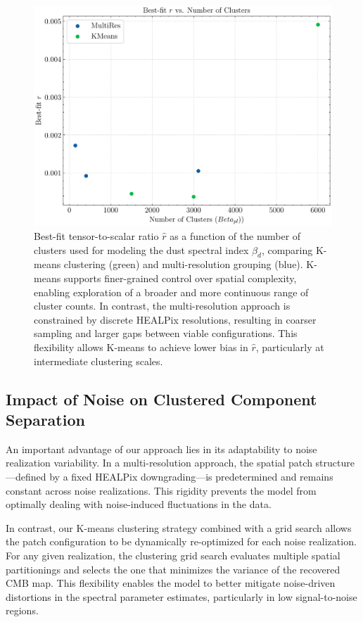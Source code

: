 \documentclass[fleqn,usenatbib]{mnras}
\begin{document}
\begin{figure}
    \centering
    \includegraphics[width=0.9\linewidth]{figures/r_vs_clusters.pdf}
    \caption{
    Best-fit tensor-to-scalar ratio \( \hat{r} \) as a function of the number of clusters used for modeling the dust spectral index \( \beta_d \), comparing K-means clustering (green) and multi-resolution grouping (blue). 
    K-means supports finer-grained control over spatial complexity, enabling exploration of a broader and more continuous range of cluster counts. 
    In contrast, the multi-resolution approach is constrained by discrete HEALPix resolutions, resulting in coarser sampling and larger gaps between viable configurations.
    This flexibility allows K-means to achieve lower bias in \( \hat{r} \), particularly at intermediate clustering scales.
}    
    \label{fig:r_vs_clusters}
\end{figure}


\subsection{Impact of Noise on Clustered Component Separation}
\label{subsec:noise_impact}

An important advantage of our approach lies in its adaptability to noise realization variability. In a multi-resolution approach, the spatial patch structure—defined by a fixed HEALPix downgrading—is predetermined and remains constant across noise realizations. This rigidity prevents the model from optimally dealing with noise-induced fluctuations in the data.

In contrast, our K-means clustering strategy combined with a grid search allows the patch configuration to be dynamically re-optimized for each noise realization. For any given realization, the clustering grid search evaluates multiple spatial partitionings and selects the one that minimizes the variance of the recovered CMB map. This flexibility enables the model to better mitigate noise-driven distortions in the spectral parameter estimates, particularly in low signal-to-noise regions.
\end{document}
